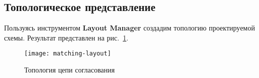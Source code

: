 \subsection{Топологическое представление}

Пользуясь инструментом \textbf{Layout Manager} создадим топологию проектируемой схемы.
Результат представлен на рис.~\ref{fig:matching-layout}.
\begin{figure}[H]
    \centering
    \texttt{[image: matching-layout]}
    \caption{Топология цепи согласования}%
    \label{fig:matching-layout}
\end{figure}
